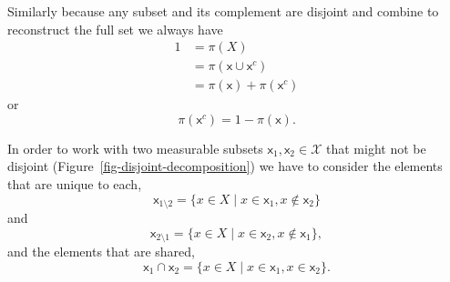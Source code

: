 \documentclass[
  letterpaper,
  DIV=11,
  numbers=noendperiod]{scrartcl}
\begin{document}
Similarly because any subset and its complement are disjoint and combine
to reconstruct the full set we always have \begin{align*}
1
&= \pi(X)
\\
&= \pi(\mathsf{x} \cup \mathsf{x}^{c})
\\
&= \pi(\mathsf{x}) + \pi(\mathsf{x}^{c})
\end{align*} or \[
\pi(\mathsf{x}^{c}) = 1 - \pi(\mathsf{x}).
\]

In order to work with two measurable subsets
\(\mathsf{x}_{1}, \mathsf{x}_{2} \in \mathcal{X}\) that might not be
disjoint (Figure~\ref{fig-disjoint-decomposition}) we have to consider
the elements that are unique to each, \[
\mathsf{x}_{1 \setminus 2}
=
\{ x \in X \mid x \in \mathsf{x}_{1}, x \notin \mathsf{x}_{2} \}
\] and \[
\mathsf{x}_{2 \setminus 1}
=
\{ x \in X \mid x \in \mathsf{x}_{2}, x \notin \mathsf{x}_{1} \},
\] and the elements that are shared, \[
\mathsf{x}_{1} \cap \mathsf{x}_{2}
=
\{ x \in X \mid x \in \mathsf{x}_{1}, x \in \mathsf{x}_{2} \}.
\]
\end{document}
